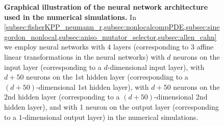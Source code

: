 \begin{figure}
	\caption{\textbf{Graphical illustration of the neural network architecture used in the numerical simulations.} In \cref{subsec:fisherKPP_neumann_r,subsec:nonlocalcompPDE,subsec:sinegordon_nonlocal,subsec:aniso_mutator_selector,subsec:allen_cahn} we employ neural networks with $4$ layers
	(corresponding to $3$ affine linear transformations in the neural networks) 
	with $d$ neurons on the input layer (corresponding to a $d$-dimensional input layer), 
	with $d + 50$ neurons on the 1st hidden layer (corresponding to a $(d+50)$-dimensional 1st hidden layer),
	with $d + 50$ neurons on the 2nd hidden layer (corresponding to a $(d+50)$-dimensional 2nd hidden layer), and 
	with 1 neuron on the output layer (corresponding to a $1$-dimensional output layer) in the numerical simulations. 
	}
	\label{fig:nn}
\end{figure}

